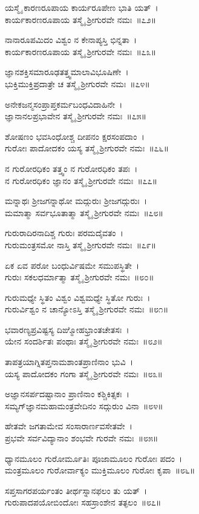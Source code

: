 ಯಸ್ಮೈ ಕಾರಣರೂಪಾಯ ಕಾರ್ಯರೂಪೇಣ ಭಾತಿ ಯತ್~।\\
ಕಾರ್ಯಕಾರಣರೂಪಾಯ ತಸ್ಮೈ ಶ್ರೀಗುರವೇ ನಮಃ~॥೭೨॥

ನಾನಾರೂಪಮಿದಂ ವಿಶ್ವಂ ನ ಕೇನಾಪ್ಯಸ್ತಿ ಭಿನ್ನತಾ~।\\
ಕಾರ್ಯಕಾರಣರೂಪಾಯ ತಸ್ಮೈ ಶ್ರೀಗುರವೇ ನಮಃ~॥೭೩॥

ಜ್ಞಾನಶಕ್ತಿಸಮಾರೂಢತತ್ತ್ವಮಾಲಾವಿಭೂಷಿಣೇ~।\\
ಭುಕ್ತಿಮುಕ್ತಿಪ್ರದಾತ್ರೇ ಚ ತಸ್ಮೈ ಶ್ರೀಗುರವೇ ನಮಃ~॥೭೪॥

ಅನೇಕಜನ್ಮಸಂಪ್ರಾಪ್ತಕರ್ಮಬಂಧವಿದಾಹಿನೇ~।\\
ಜ್ಞಾನಾನಲಪ್ರಭಾವೇನ ತಸ್ಮೈ ಶ್ರೀಗುರವೇ ನಮಃ~॥೭೫॥

ಶೋಷಣಂ ಭವಸಿಂಧೋಶ್ಚ ದೀಪನಂ ಕ್ಷರಸಂಪದಾಂ~।\\
ಗುರೋಃ ಪಾದೋದಕಂ ಯಸ್ಯ ತಸ್ಮೈ ಶ್ರೀಗುರವೇ ನಮಃ~॥೭೬॥

ನ ಗುರೋರಧಿಕಂ ತತ್ತ್ವಂ ನ ಗುರೋರಧಿಕಂ ತಪಃ~।\\
ನ ಗುರೋರಧಿಕಂ ಜ್ಞಾನಂ ತಸ್ಮೈ ಶ್ರೀಗುರವೇ ನಮಃ~॥೭೭॥

ಮನ್ನಾಥಃ ಶ್ರೀಜಗನ್ನಾಥೋ ಮದ್ಗುರುಃ ಶ್ರೀಜಗದ್ಗುರುಃ~।\\
ಮಮಾತ್ಮಾ ಸರ್ವಭೂತಾತ್ಮಾ ತಸ್ಮೈ ಶ್ರೀಗುರವೇ ನಮಃ~॥೭೮॥

ಗುರುರಾದಿರನಾದಿಶ್ಚ ಗುರುಃ ಪರಮದೈವತಂ~।\\
ಗುರುಮಂತ್ರಸಮೋ ನಾಸ್ತಿ ತಸ್ಮೈ ಶ್ರೀಗುರವೇ ನಮಃ~॥೭೯॥

ಏಕ ಏವ ಪರೋ ಬಂಧುರ್ವಿಷಮೇ ಸಮುಪಸ್ಥಿತೇ~।\\
ಗುರುಃ ಸಕಲಧರ್ಮಾತ್ಮಾ ತಸ್ಮೈ ಶ್ರೀಗುರವೇ ನಮಃ~॥೮೦॥

ಗುರುಮಧ್ಯೇ ಸ್ಥಿತಂ ವಿಶ್ವಂ ವಿಶ್ವಮಧ್ಯೇ ಸ್ಥಿತೋ ಗುರುಃ~।\\
ಗುರುರ್ವಿಶ್ವಂ ನ ಚಾನ್ಯೋಽಸ್ತಿ ತಸ್ಮೈ ಶ್ರೀಗುರವೇ ನಮಃ~॥೮೧॥

ಭವಾರಣ್ಯಪ್ರವಿಷ್ಟಸ್ಯ ದಿಙ್ಮೋಹಭ್ರಾಂತಚೇತಸಃ~।\\
ಯೇನ ಸಂದರ್ಶಿತಃ ಪಂಥಾಃ ತಸ್ಮೈ ಶ್ರೀಗುರವೇ ನಮಃ~॥೮೨॥

ತಾಪತ್ರಯಾಗ್ನಿತಪ್ತನಾಮಶಾಂತಪ್ರಾಣಿನಾಂ ಭುವಿ~।\\
ಯಸ್ಯ ಪಾದೋದಕಂ ಗಂಗಾ ತಸ್ಮೈ ಶ್ರೀಗುರವೇ ನಮಃ~॥೮೩॥

ಅಜ್ಞಾನಸರ್ಪದಷ್ಟಾನಾಂ ಪ್ರಾಣಿನಾಂ ಕಶ್ಚಿಕಿತ್ಸಕಃ~।\\
ಸಮ್ಯಗ್‌ಜ್ಞಾನಮಹಾಮಂತ್ರವೇದಿನಂ ಸದ್ಗುರುಂ ವಿನಾ~॥೮೪॥

ಹೇತವೇ ಜಗತಾಮೇವ ಸಂಸಾರಾರ್ಣವಸೇತವೇ~।\\
ಪ್ರಭವೇ ಸರ್ವವಿದ್ಯಾನಾಂ ಶಂಭವೇ ಗುರವೇ ನಮಃ~॥೮೫॥

ಧ್ಯಾನಮೂಲಂ ಗುರೋರ್ಮೂತಿಃ ಪೂಜಾಮೂಲಂ ಗುರೋಃ ಪದಂ~।\\
ಮಂತ್ರಮೂಲಂ ಗುರೋರ್ವಾಕ್ಯಂ ಮುಕ್ತಿಮೂಲಂ ಗುರೋಃ ಕೃಪಾ~॥೮೬॥

ಸಪ್ತಸಾಗರಪರ್ಯಂತಂ ತೀರ್ಥಸ್ನಾನಫಲಂ ತು ಯತ್~।\\
ಗುರುಪಾದಪಯೋಬಿಂದೋಃ ಸಹಸ್ರಾಂಶೇನ ತತ್ಫಲಂ~॥೮೭॥

